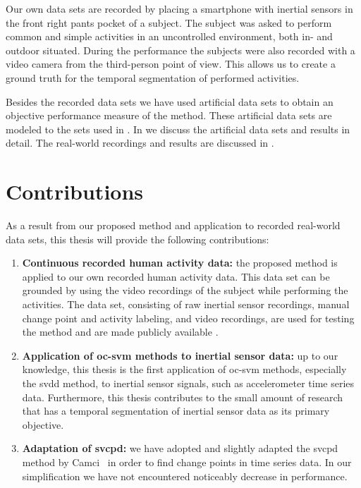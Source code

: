 Our own data sets are recorded by placing a smartphone with inertial sensors in the front right pants pocket of a subject.
The subject was asked to perform common and simple activities in an uncontrolled environment, both in- and outdoor situated.
During the performance the subjects were also recorded with a video camera from the third-person point of view.
This allows us to create a ground truth for the temporal segmentation of performed activities.

Besides the recorded data sets we have used artificial data sets to obtain an objective performance measure of the method.
These artificial data sets are modeled to the sets used in \cite{camci2010change,takeuchi2006unifying}.
In  we discuss the artificial data sets and results in detail.
The real-world recordings and results are discussed in .

\section{Contributions}
As a result from our proposed method and application to recorded real-world data sets, this thesis will provide the following contributions:
\begin{enumerate}
  \item \textbf{Continuous recorded human activity data:} the proposed method is applied to our own recorded human activity data.
  This data set can be grounded by using the video recordings of the subject while performing the activities.
  The data set, consisting of raw inertial sensor recordings, manual change point and activity labeling, and video recordings, are used for testing the method and are made publicly available \cite{vlasveld2013continuous}.
  \item \textbf{Application of \gls{oc-svm} methods to inertial sensor data:} up to our knowledge, this thesis is the first application of \gls{oc-svm} methods, especially the \gls{svdd} method, to inertial sensor signals, such as accelerometer time series data.
  Furthermore, this thesis contributes to the small amount of research that has a temporal segmentation of inertial sensor data as its primary objective.
  \item \textbf{Adaptation of \acrshort{svcpd}:} we have adopted and slightly adapted the \acrshort{svcpd} method by Camci~\cite{camci2010change} in order to find change points in time series data.
  In our simplification we have not encountered noticeably decrease in performance.
\end{enumerate}

